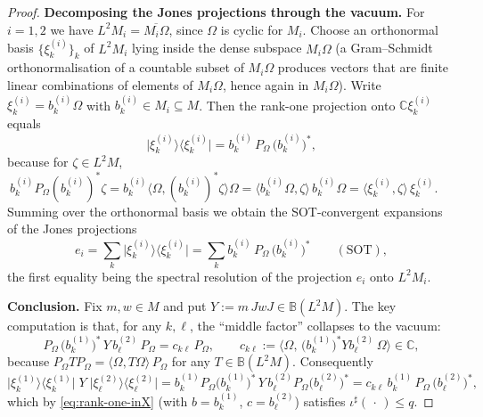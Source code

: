 \documentclass[a4paper, 11pt, reqno]{amsart}
\numberwithin{equation}{section}
\theoremstyle{plain}
\theoremstyle{remark}
\theoremstyle{definition}
\newcommand{\C}{\mathbb{C}}
\newcommand{\B}{\mathbb{B}}
\begin{document}
\begin{proof}
\medskip\noindent\textbf{Decomposing the Jones projections through the vacuum.}
For $i=1,2$ we have $L^2M_i=\overline{M_i\Omega}$, since $\Omega$ is cyclic for $M_i$. Choose an orthonormal basis $\{\xi^{(i)}_k\}_{k}$ of $L^2M_i$ lying inside the dense subspace $M_i\Omega$ (a Gram--Schmidt orthonormalisation of a countable subset of $M_i\Omega$ produces vectors that are finite linear combinations of elements of $M_i\Omega$, hence again in $M_i\Omega$). Write $\xi^{(i)}_k=b^{(i)}_k\Omega$ with $b^{(i)}_k\in M_i\subseteq M$. Then the rank-one projection onto $\C\xi^{(i)}_k$ equals
\begin{equation}\label{eq:rankone}
\big|\xi^{(i)}_k\big\rangle\big\langle\xi^{(i)}_k\big|=b^{(i)}_k\,P_\Omega\,\big(b^{(i)}_k\big)^*,
\end{equation}
because for $\zeta\in L^2M$, $\ b^{(i)}_k P_\Omega (b^{(i)}_k)^*\zeta=b^{(i)}_k\langle\Omega,(b^{(i)}_k)^*\zeta\rangle\Omega=\langle b^{(i)}_k\Omega,\zeta\rangle\,b^{(i)}_k\Omega=\langle\xi^{(i)}_k,\zeta\rangle\,\xi^{(i)}_k$. Summing over the orthonormal basis we obtain the SOT-convergent expansions of the Jones projections
\begin{equation}\label{eq:eSOT}
e_i=\sum_k\big|\xi^{(i)}_k\big\rangle\big\langle\xi^{(i)}_k\big|=\sum_k b^{(i)}_k\,P_\Omega\,\big(b^{(i)}_k\big)^*\qquad(\text{SOT}),
\end{equation}
the first equality being the spectral resolution of the projection $e_i$ onto $L^2M_i$.

\medskip\noindent\textbf{Conclusion.}
Fix $m,w\in M$ and put $Y:=m\,JwJ\in\B(L^2M)$. The key computation is that, for any $k,\ell$, the ``middle factor'' collapses to the vacuum:
\[
P_\Omega\,\big(b^{(1)}_k\big)^*\,Y\,b^{(2)}_\ell\,P_\Omega=c_{k\ell}\,P_\Omega,\qquad
c_{k\ell}:=\big\langle\Omega,\,\big(b^{(1)}_k\big)^*Yb^{(2)}_\ell\,\Omega\big\rangle\in\C ,
\]
because $P_\Omega T P_\Omega=\langle\Omega,T\Omega\rangle\,P_\Omega$ for any $T\in\B(L^2M)$. Consequently
\begin{equation}\label{eq:cross}
\big|\xi^{(1)}_k\big\rangle\big\langle\xi^{(1)}_k\big|\;Y\;\big|\xi^{(2)}_\ell\big\rangle\big\langle\xi^{(2)}_\ell\big|
=b^{(1)}_k P_\Omega \big(b^{(1)}_k\big)^*\,Y\,b^{(2)}_\ell P_\Omega \big(b^{(2)}_\ell\big)^*
=c_{k\ell}\,b^{(1)}_k\,P_\Omega\,\big(b^{(2)}_\ell\big)^* ,
\end{equation}
which by \eqref{eq:rank-one-inX} (with $b=b^{(1)}_k$, $c=b^{(2)}_\ell$) satisfies $\iota^\sharp(\,\cdot\,)\le q$.


\end{proof}
\end{document}
